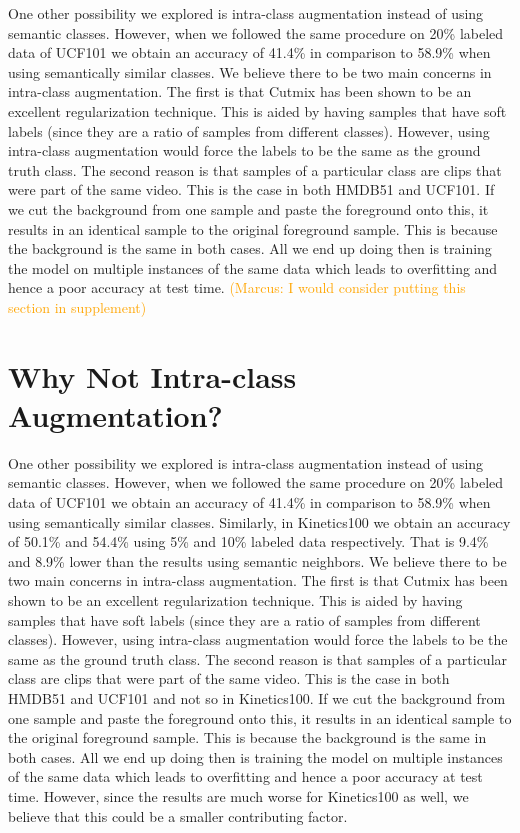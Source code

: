 \documentclass[runningheads]{llncs}
\newcommand{\marcus}[1]{{\textcolor{orange}{(Marcus: #1)}}}
\begin{document}
One other possibility we explored is intra-class augmentation instead of using semantic classes. However, when we followed the same procedure on 20\% labeled data of UCF101 we obtain an accuracy of 41.4\% in comparison to 58.9\% when using semantically similar classes. We believe there to be two main concerns in intra-class augmentation. The first is that Cutmix \cite{yun2019cutmix} has been shown to be an excellent regularization technique. This is aided by having samples that have soft labels (since they are a ratio of samples from different classes). However, using intra-class augmentation would force the labels to be the same as the ground truth class. The second reason is that samples of a particular class are clips that were part of the same video. This is the case in both HMDB51 and UCF101. If we cut the background from one sample and paste the foreground onto this, it results in an identical sample to the original foreground sample. This is because the background is the same in both cases. All we end up doing then is training the model on multiple instances of the same data which leads to overfitting and hence a poor accuracy at test time. \marcus{I would consider putting this section in supplement}
\fi

\section{Why Not Intra-class Augmentation?}
\label{intra-class}
One other possibility we explored is intra-class augmentation instead of using semantic classes. However, when we followed the same procedure on 20\% labeled data of UCF101 we obtain an accuracy of 41.4\% in comparison to 58.9\% when using semantically similar classes. Similarly, in Kinetics100 we obtain an accuracy of 50.1\% and 54.4\% using 5\% and 10\% labeled data respectively. That is 9.4\% and 8.9\% lower than the results using semantic neighbors. We believe there to be two main concerns in intra-class augmentation. The first is that Cutmix \cite{yun2019cutmix} has been shown to be an excellent regularization technique. This is aided by having samples that have soft labels (since they are a ratio of samples from different classes). However, using intra-class augmentation would force the labels to be the same as the ground truth class. The second reason is that samples of a particular class are clips that were part of the same video.
This is the case in both HMDB51 and UCF101 and not so in Kinetics100. If we cut the background from one sample and paste the foreground onto this, it results in an identical sample to the original foreground sample. This is because the background is the same in both cases. All we end up doing then is training the model on multiple instances of the same data which leads to overfitting and hence a poor accuracy at test time. However, since the results are much worse for Kinetics100 as well, we believe that this could be a smaller contributing factor.
\end{document}

